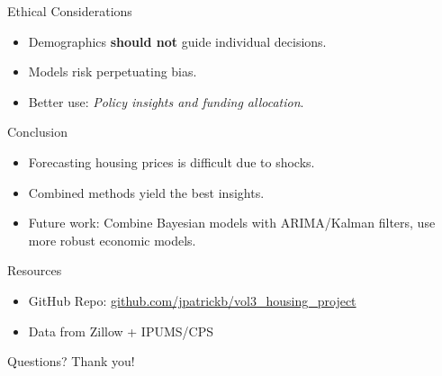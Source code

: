 \documentclass{beamer}
\begin{document}
\begin{frame}{Ethical Considerations} %
  \begin{itemize}%
    \item Demographics \textbf{should not} guide individual decisions.
    \item Models risk perpetuating bias.
    \item Better use: \textit{Policy insights and funding allocation}.
  \end{itemize}
\end{frame}


\begin{frame}{Conclusion} 
  \begin{itemize}%
    \item Forecasting housing prices is difficult due to shocks.
    \item Combined methods yield the best insights.
    \item Future work: Combine Bayesian models with ARIMA/Kalman filters, use more robust economic models.
  \end{itemize}
\end{frame}

\begin{frame}{Resources}
  \begin{itemize}%
    \item GitHub Repo: \href{https://github.com/jpatrickb/vol3_housing_project}{github.com/jpatrickb/vol3\_housing\_project}
    \item Data from Zillow + IPUMS/CPS
  \end{itemize}
\end{frame}

\begin{frame}{Questions?}
  \centering
  \Large Thank you!
\end{frame}
\end{document}
